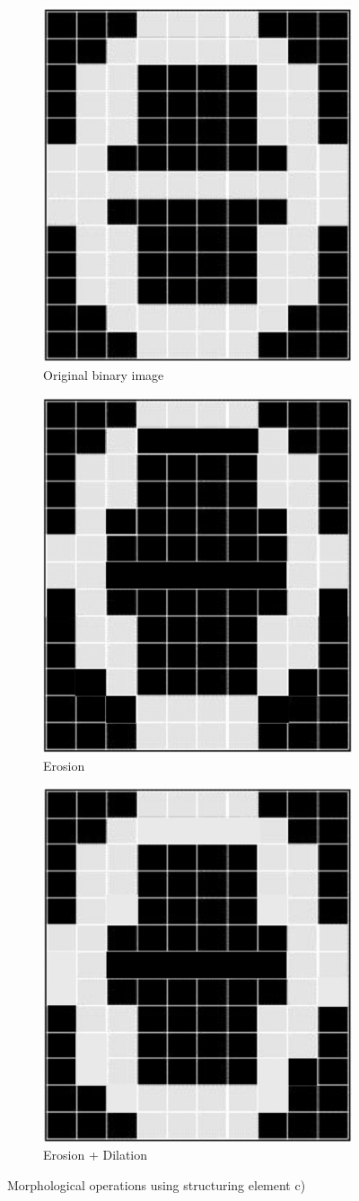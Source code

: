 \documentclass[tikz,14pt,fleqn]{article}
\begin{document}
\begin{figure}[h!]
    \begin{subfigure}[b]{0.33\linewidth}
        \centering
    \includegraphics[width=.5\linewidth]{fig/3.0.png}
    \caption{Original binary image}
    \end{subfigure}
    \begin{subfigure}[b]{0.33\linewidth}
        \centering
        \includegraphics[width=.5\linewidth]{fig/3.1.png}
        \caption{Erosion}
    \end{subfigure}
    \begin{subfigure}[b]{0.33\linewidth}
        \centering
        \includegraphics[width=.5\linewidth]{fig/3.2.png}
        \caption{Erosion + Dilation}
    \end{subfigure}
    \caption{Morphological operations using structuring element c)}
    \label{fig:3}
\end{figure}
\end{document}
